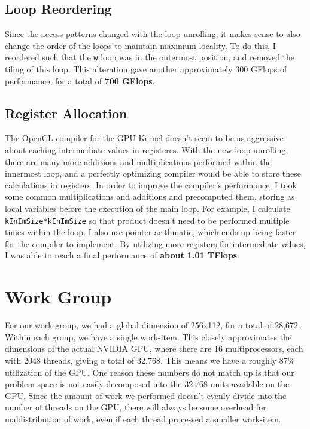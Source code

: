 \documentclass[letterpaper,twocolumn,10pt]{article}
\def\code#1{\texttt{#1}}
\begin{document}
\subsection{Loop Reordering}
Since the access patterns changed with the loop unrolling, it makes sense to
also change the order of the loops to maintain maximum locality. To do this, I
reordered such that the \code{w} loop was in the outermost position, and
removed the tiling of this loop. This alteration gave another approximately
300 GFlops of performance, for a total of \textbf{700 GFlops}.

\subsection{Register Allocation}
The OpenCL compiler for the GPU Kernel doesn't seem to be as aggressive about
caching intermediate values in registeres. With the new loop unrolling, there
are many more additions and multiplications performed within the innermost
loop, and a perfectly optimizing compiler would be able to store these
calculations in registers. In order to improve the compiler's performance, I
took some common multiplications and additions and precomputed them, storing as
local variables before the execution of the main loop. For example, I calculate
\code{kInImSize*kInImSize} so that product doesn't need to be performed
multiple times within the loop. I also use pointer-arithmatic, which ends up
being faster for the compiler to implement. By utilizing more registers for
intermediate values, I was able to reach a final performance of 
\textbf{about 1.01 TFlops}.
\section{Work Group}
For our work group, we had a global dimension of 256x112, for a total of
28,672. Within each group, we have a single work-item. This closely
approximates the dimensions of the actual NVIDIA GPU, where there are 16 
multiprocessors, each with 2048 threads, giving a total of 32,768. This means
we have a roughly 87\% utilization of the GPU. One reason these numbers do not
match up is that our problem space is not easily decomposed into the 32,768
units available on the GPU. Since the amount of work we performed doesn't
evenly divide into the number of threads on the GPU, there will always be some
overhead for maldistribution of work, even if each thread processed a smaller
work-item.
\end{document}
